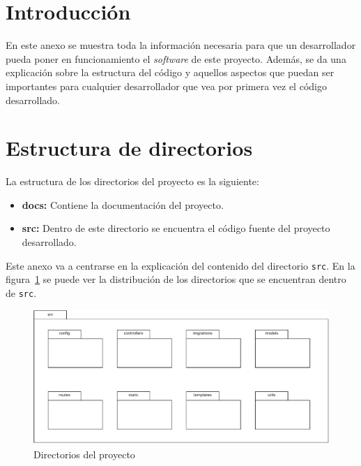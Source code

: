 
\section{Introducción}
En este anexo se muestra toda la información necesaria para que un desarrollador pueda poner en funcionamiento el \textit{software} de este proyecto.
Además, se da una explicación sobre la estructura del código y aquellos aspectos que puedan ser importantes para cualquier desarrollador que vea por primera vez el código desarrollado.

\section{Estructura de directorios}
La estructura de los directorios del proyecto es la siguiente:
\begin{itemize}
\item \textbf{docs:} Contiene la documentación del proyecto.
\item \textbf{src:} Dentro de este directorio se encuentra el código fuente del proyecto desarrollado.
\end{itemize}

Este anexo va a centrarse en la explicación del contenido del directorio \texttt{src}.
En la figura~\ref{fig:directorios} se puede ver la distribución de los directorios que se encuentran dentro de \texttt{src}.

\begin{figure}
	\centering
	\includegraphics[width=\textwidth]{../img/Anexos/directorios.pdf}
	\caption{Directorios del proyecto}\label{fig:directorios}
\end{figure}


